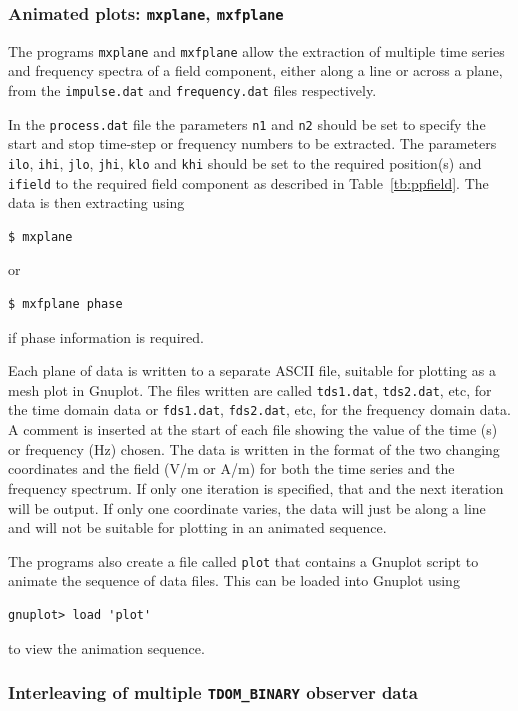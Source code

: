 \documentclass[onecolumn,a4paper]{article}
\numberwithin{equation}{section}
\begin{document}
\subsubsection{Animated plots: \texttt{mxplane}, \texttt{mxfplane}}

The programs \texttt{mxplane} and \texttt{mxfplane} allow the extraction of multiple time series and frequency spectra
of a field component, either along a line or across a plane, from the \texttt{impulse.dat} and \texttt{frequency.dat} 
files respectively.

In the \texttt{process.dat} file the parameters \texttt{n1} and \texttt{n2} should be set to specify the start and stop 
time-step or frequency numbers to be extracted. The parameters \texttt{ilo}, \texttt{ihi}, \texttt{jlo}, \texttt{jhi}, \texttt{klo}
and \texttt{khi} should be set to the required position(s) and \texttt{ifield} to the required field component as described in 
Table~\ref{tb:ppfield}. The data is then extracting using
\begin{verbatim}
$ mxplane
\end{verbatim}
or
\begin{verbatim}
$ mxfplane phase
\end{verbatim}
if phase information is required.

Each plane of data is written to a separate ASCII file, suitable for plotting as a mesh plot in Gnuplot. The files written are 
called \texttt{tds1.dat}, \texttt{tds2.dat}, etc, for the time domain data or \texttt{fds1.dat}, \texttt{fds2.dat}, etc, 
for the frequency domain data. A comment is inserted at the start of each file showing the value of the time (s) or frequency 
(Hz) chosen. The data is written in the format of the two changing coordinates and the field (V/m or A/m) for both the time 
series and the frequency spectrum. If only one iteration is specified, that and the next iteration will be output.
If only one coordinate varies, the data will just be along a line and will not be suitable for plotting in an animated sequence.

The programs also create a file called \texttt{plot} that contains a Gnuplot script to animate the sequence of data files. This 
can be loaded into Gnuplot using 
\begin{verbatim}
gnuplot> load 'plot'
\end{verbatim}
to view the animation sequence.

\subsubsection{Interleaving of multiple \texttt{TDOM\_BINARY} observer data}
\end{document}
